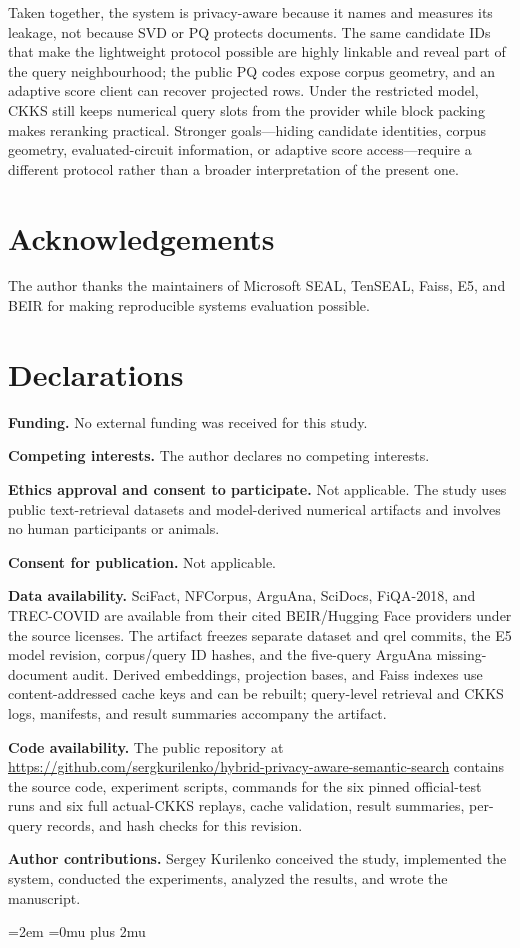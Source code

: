 \documentclass[pdflatex,sn-basic,Numbered]{sn-jnl}
\theoremstyle{plain}
\begin{document}
Taken together, the system is privacy-aware because it names and measures its leakage, not because SVD or PQ protects documents. The same candidate IDs that make the lightweight protocol possible are highly linkable and reveal part of the query neighbourhood; the public PQ codes expose corpus geometry, and an adaptive score client can recover projected rows. Under the restricted model, CKKS still keeps numerical query slots from the provider while block packing makes reranking practical. Stronger goals---hiding candidate identities, corpus geometry, evaluated-circuit information, or adaptive score access---require a different protocol rather than a broader interpretation of the present one.

\backmatter

\section*{Acknowledgements}

The author thanks the maintainers of Microsoft SEAL, TenSEAL, Faiss, E5, and BEIR for making reproducible systems evaluation possible.

\section*{Declarations}

\textbf{Funding.} No external funding was received for this study.

\textbf{Competing interests.} The author declares no competing interests.

\textbf{Ethics approval and consent to participate.} Not applicable. The study uses public text-retrieval datasets and model-derived numerical artifacts and involves no human participants or animals.

\textbf{Consent for publication.} Not applicable.

\textbf{Data availability.} SciFact, NFCorpus, ArguAna, SciDocs, FiQA-2018, and TREC-COVID are available from their cited BEIR/Hugging Face providers under the source licenses. The artifact freezes separate dataset and qrel commits, the E5 model revision, corpus/query ID hashes, and the five-query ArguAna missing-document audit. Derived embeddings, projection bases, and Faiss indexes use content-addressed cache keys and can be rebuilt; query-level retrieval and CKKS logs, manifests, and result summaries accompany the artifact.

\textbf{Code availability.} The public repository at \url{https://github.com/sergkurilenko/hybrid-privacy-aware-semantic-search} contains the source code, experiment scripts, commands for the six pinned official-test runs and six full actual-CKKS replays, cache validation, result summaries, per-query records, and hash checks for this revision.

\textbf{Author contributions.} Sergey Kurilenko conceived the study, implemented the system, conducted the experiments, analyzed the results, and wrote the manuscript.

\begingroup
\emergencystretch=2em
\Urlmuskip=0mu plus 2mu\relax

\endgroup
\end{document}
